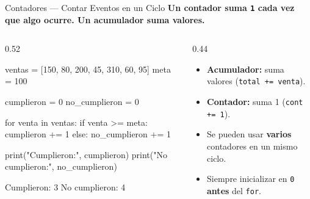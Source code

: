\documentclass[aspectratio=169, 11pt]{beamer}
\begin{document}
\begin{frame}[fragile,shrink=30]{Contadores --- Contar Eventos en un Ciclo}
  \vspace{-6pt}
  {\small\color{arcaDark}\bfseries
    Un \textbf{contador} suma \texttt{1} cada vez que algo ocurre.
    Un \textbf{acumulador} suma \textbf{valores}.}

  \vspace{4pt}
  \begin{columns}[T]
    \begin{column}{0.52\textwidth}
      \begin{pyblock}
ventas = [150, 80, 200, 45, 310, 60, 95]
meta = 100

cumplieron = 0
no_cumplieron = 0

for venta in ventas:
    if venta >= meta:
        cumplieron += 1
    else:
        no_cumplieron += 1

print("Cumplieron:", cumplieron)
print("No cumplieron:", no_cumplieron)
      \end{pyblock}
      \vspace{-2pt}
      \begin{outputblock}
Cumplieron: 3
No cumplieron: 4
      \end{outputblock}
    \end{column}

    \begin{column}{0.44\textwidth}
      \vspace{2pt}
      {\footnotesize\color{textMuted}
      \begin{itemize}\setlength{\itemsep}{5pt}
        \item[{\color{arcaRed}\scriptsize\faArrowRight}]
          \textbf{Acumulador:} suma valores
          (\texttt{total += venta}).
        \item[{\color{arcaRed}\scriptsize\faArrowRight}]
          \textbf{Contador:} suma 1
          (\texttt{cont += 1}).
        \item[{\color{arcaRed}\scriptsize\faArrowRight}]
          Se pueden usar \textbf{varios}
          contadores en un mismo ciclo.
        \item[{\color{arcaRed}\scriptsize\faLightbulb}]
          Siempre inicializar en \texttt{0}
          \textbf{antes} del \texttt{for}.
      \end{itemize}
      }
    \end{column}
  \end{columns}
\end{frame}
\end{document}
